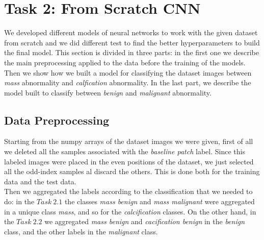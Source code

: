 \documentclass[11pt,a4paper,oneside]{article}
\begin{document}
\clearpage

\section{Task 2: From Scratch CNN}
We developed different models of neural networks to work with the given dataset from scratch and we did different test to find the better hyperparameters to build the final model. This section is divided in three parts: in the first one we describe the main preprocessing applied to the data before the training of the models. Then we show how we built a model for classifying the dataset images between \textit{mass} abnormality and \textit{calfication} abnormality. In the last part, we describe the model built to classify between \textit{benign} and \textit{malignant} abnormality.

\subsection{Data Preprocessing}
Starting from the numpy arrays of the dataset images we were given, first of all we deleted all the samples associated with the \textit{baseline patch} label. Since this labeled images were placed in the even positions of the dataset, we just selected all the odd-index samples al discard the others. This is done both for the training data and the test data. \\
Then we aggregated the labels according to the classification that we needed to do: in the $Task\ 2.1$ the classes \textit{mass benign} and  \textit{mass malignant} were aggregated in a unique class \textit{mass}, and so for the \textit{calcification} classes. On the other hand, in the $Task\ 2.2$ we aggregated  \textit{mass benign} and  \textit{cacification benign} in the \textit{benign} class, and the other labels in the \textit{malignant} class.
\end{document}
